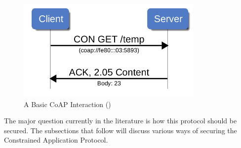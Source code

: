\documentclass[letterpaper, 12pt]{article}
\begin{document}
\begin{flushleft}
\begin{figure}[H]
	\includegraphics[width=\linewidth,height=5cm,keepaspectratio]{figure8.png}
	\caption[A Basic CoAP Interaction]{A Basic CoAP Interaction (\cite{Capossele})}
	\label{fig:arch}
\end{figure}

The major question currently in the literature is how this protocol should be secured. The subsections that follow will discuss various ways of securing
the Constrained Application Protocol. 


\end{flushleft}
\end{document}

